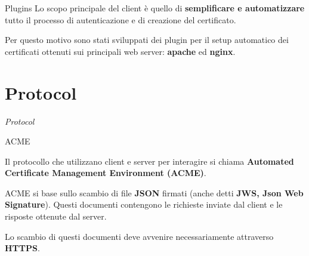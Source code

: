 \documentclass[xcolor=svgnames,11pt]{beamer}
\begin{document}
\begin{frame}{Plugins}
Lo scopo principale del client è quello di \textbf{semplificare e automatizzare} tutto il processo di
autenticazione e di creazione del certificato.

\medskip\pause

Per questo motivo sono stati sviluppati dei plugin per il setup automatico dei certificati ottenuti
sui principali web server: \textbf{apache} ed \textbf{nginx}.


\end{frame}

\section{Protocol}
\begin{frame}{}
\begin{center}
\begin{Huge}
\textcolor{leorange}{\emph{Protocol}}
\end{Huge}
\end{center}
\end{frame}


\begin{frame}{ACME}

\begin{block}{}
Il protocollo che utilizzano client e server per interagire si chiama \textbf{Automated Certificate Management Environment (ACME)}.
\end{block}

\medskip \pause
ACME si base sullo scambio di file \textbf{JSON} firmati (anche detti \textbf{JWS, Json Web Signature}).
Questi documenti contengono le richieste inviate dal client e le risposte ottenute dal server.

\medskip \pause
Lo scambio di questi documenti deve avvenire necessariamente attraverso \textbf{HTTPS}.
\end{frame}
\end{document}
